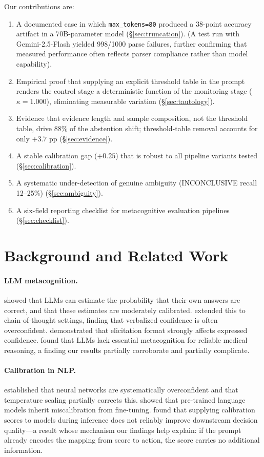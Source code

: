 \documentclass[11pt]{article}
\begin{document}
Our contributions are:
\begin{enumerate}
    \item A documented case in which \texttt{max\_tokens=80} produced a 38-point accuracy artifact in a 70B-parameter model (\S\ref{sec:truncation}). (A test run with Gemini-2.5-Flash yielded 998/1000 parse failures, further confirming that measured performance often reflects parser compliance rather than model capability).
    \item Empirical proof that supplying an explicit threshold table in the prompt renders the control stage a deterministic function of the monitoring stage ($\kappa = 1.000$), eliminating measurable variation (\S\ref{sec:tautology}).
    \item Evidence that evidence length and sample composition, not the threshold table, drive 88\% of the abstention shift; threshold-table removal accounts for only $+3.7$ pp (\S\ref{sec:evidence}).
    \item A stable calibration gap ($+0.25$) that is robust to all pipeline variants tested (\S\ref{sec:calibration}).
    \item A systematic under-detection of genuine ambiguity (INCONCLUSIVE recall 12--25\%) (\S\ref{sec:ambiguity}).
    \item A six-field reporting checklist for metacognitive evaluation pipelines (\S\ref{sec:checklist}).
\end{enumerate}

\section{Background and Related Work}

\paragraph{LLM metacognition.} \citet{kadavath2022language} showed that LLMs can estimate the probability that their own answers are correct, and that these estimates are moderately calibrated. \citet{xiong2024can} extended this to chain-of-thought settings, finding that verbalized confidence is often overconfident. \citet{tian2023just} demonstrated that elicitation format strongly affects expressed confidence. \citet{griot2025large} found that LLMs lack essential metacognition for reliable medical reasoning, a finding our results partially corroborate and partially complicate.

\paragraph{Calibration in NLP.} \citet{guo2017calibration} established that neural networks are systematically overconfident and that temperature scaling partially corrects this. \citet{desai2020calibration} showed that pre-trained language models inherit miscalibration from fine-tuning. \citet{wang2026mirror} found that supplying calibration scores to models during inference does not reliably improve downstream decision quality---a result whose mechanism our findings help explain: if the prompt already encodes the mapping from score to action, the score carries no additional information.
\end{document}
